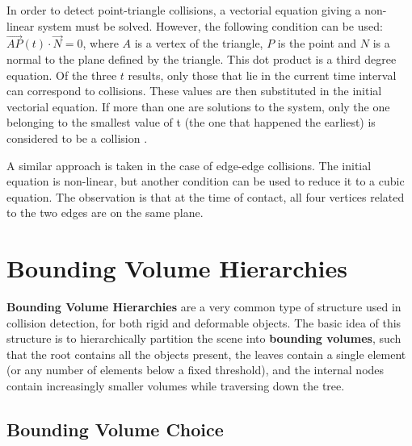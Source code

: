 In order to detect point-triangle collisions, a vectorial equation giving a non-linear system must be solved. However, the following condition can be used: $\overrightarrow{AP}(t) \cdot \overrightarrow{N} = 0$, where $A$ is a vertex of the triangle, $P$ is the point and $N$ is a normal to the plane defined by the triangle. This dot product is a third degree equation. Of the three $t$ results, only those that lie in the current time interval can correspond to collisions. These values are then substituted in the initial vectorial equation. If more than one are solutions to the system, only the one belonging to the smallest value of t (the one that happened the earliest) is considered to be a collision \citep{provot97}.

A similar approach is taken in the case of edge-edge collisions. The initial equation is non-linear, but another condition can be used to reduce it to a cubic equation. The observation is that at the time of contact, all four vertices related to the two edges are on the same plane.


\section{Bounding Volume Hierarchies}
\label{sec:bvh}

\textbf{Bounding Volume Hierarchies} are a very common type of structure used in collision detection, for both rigid and deformable objects. The basic idea of this structure is to hierarchically partition the scene into \textbf{bounding volumes}, such that the root contains all the objects present, the leaves contain a single element (or any number of elements below a fixed threshold), and the internal nodes contain increasingly smaller volumes while traversing down the tree.

\subsection{Bounding Volume Choice}
\label{sub-sec:bvc}

